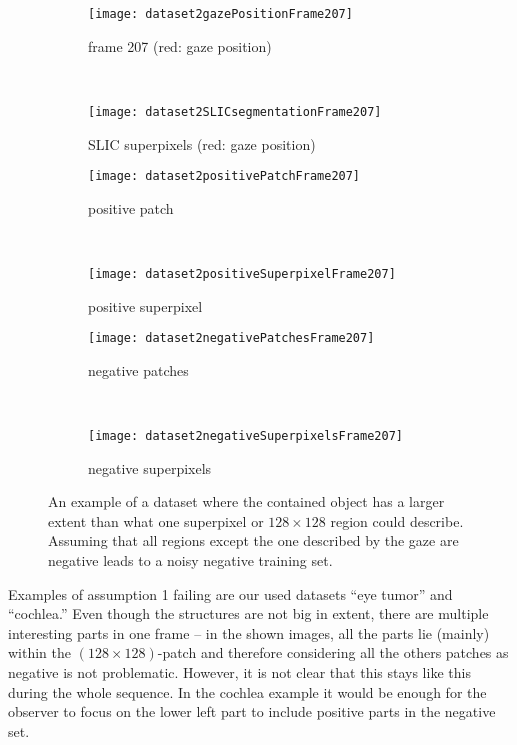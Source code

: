 \begin{figure}[ht]
	\centering
	\begin{subfigure}[h]{0.48\textwidth}
		\texttt{[image: dataset2gazePositionFrame207]}
		\caption*{frame 207 (red: gaze position)}
	\end{subfigure}
	~
	\begin{subfigure}[h]{0.48\textwidth}
	    \texttt{[image: dataset2SLICsegmentationFrame207]}
	    \caption*{SLIC superpixels (red: gaze position)}
	\end{subfigure}
	
	\vspace{3mm}
	\begin{subfigure}[h]{0.31\textwidth}
		\texttt{[image: dataset2positivePatchFrame207]}	
		\caption*{positive patch}
	\end{subfigure}
	~
	\begin{subfigure}[h]{0.31\textwidth}
		\texttt{[image: dataset2positiveSuperpixelFrame207]}	
		\caption*{positive superpixel}
	\end{subfigure}
	
	\vspace{3mm}
		\begin{subfigure}[h]{0.48\textwidth}
		\texttt{[image: dataset2negativePatchesFrame207]}	
		\caption*{negative patches}
	\end{subfigure}
	~
	\begin{subfigure}[h]{0.48\textwidth}
		\texttt{[image: dataset2negativeSuperpixelsFrame207]}	
		\caption*{negative superpixels}
	\end{subfigure}	
	\caption{An example of a dataset where the contained object has a larger extent than what one superpixel or $128 \times 128$ region could describe. Assuming that all regions except the one described by the gaze are negative leads to a noisy negative training set.}
	\label{fig:nonValidAssumptionD2}
\end{figure}

Examples of assumption 1 failing are our used datasets ``eye tumor'' and ``cochlea.'' Even though the structures are not big in extent, there are multiple interesting parts in one frame -- in the shown images, all the parts lie (mainly) within the $(128\times128)$-patch and therefore considering all the others patches as negative is not problematic. 
However, it is not clear that this stays like this during the whole sequence.
In the cochlea example it would be enough for the observer to focus on the lower left part to include positive parts in the negative set. 

